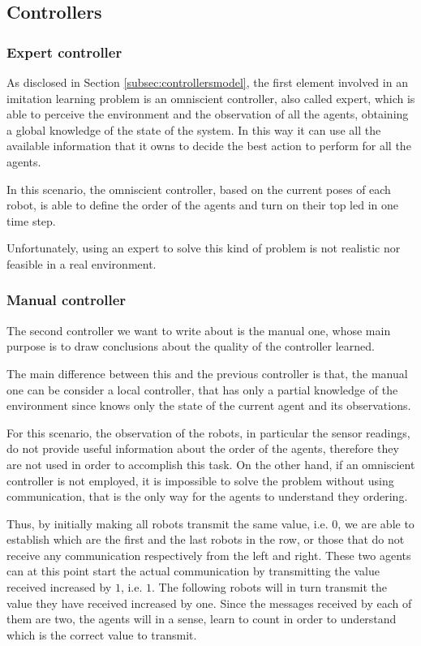 \subsection{Controllers}
\label{subsec:task2controllers}

\subsubsection{Expert controller}
\label{subsubsec:omniscient2}

As disclosed in Section \ref{subsec:controllersmodel}, the first element involved in 
an imitation learning problem is an omniscient controller, also called expert, 
which is able to perceive the environment and the observation of all the agents, 
obtaining a global knowledge of the state of the system. In this way it can use all 
the available information that it owns to decide the best action to perform for all 
the agents.

In this scenario, the omniscient controller, based on the current poses of each 
robot, is able to define the order of the agents and turn on their top \gls{led}  in 
one 
time step.

Unfortunately, using an expert to solve this kind of problem is not realistic nor 
feasible in a real environment.

\subsubsection{Manual controller}
\label{subsubsec:manual2}

The second controller we want to write about is the manual one, whose main 
purpose is to draw conclusions about the quality of the controller learned.

The main difference between this and the previous controller is that, the manual 
one can be consider a local controller, that has only a partial knowledge of the 
environment since knows only the state of the current agent and its 
observations.

For this scenario, the observation of the robots, in particular the sensor readings, 
do not provide useful information about the order of the agents, therefore they 
are not used in order to accomplish this task.
On the other hand, if an omniscient controller is not employed, it is impossible to 
solve the problem without using communication, that is the only way for the 
agents to understand they ordering.

Thus, by initially making all robots transmit the same value, i.e. $0$, we are able 
to establish which are the first and the last robots in the row, or those that do not 
receive any communication respectively from the left and right. 
These two agents can at this point start the actual communication by transmitting 
the value received increased by $1$, i.e. $1$. 
The following robots will in turn transmit the value they have received increased 
by one. Since the messages received by each of them are two, the agents will in a 
sense, learn to count in order to understand which is the correct value to 
transmit.

